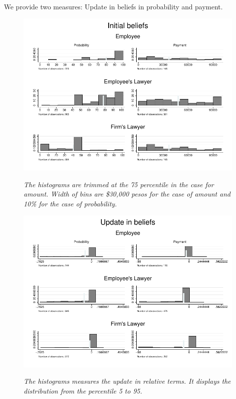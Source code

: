 \documentclass[12pt]{article}
\theoremstyle{named}
\newcommand{\folder}{./Effect}
\begin{document}
We provide two measures: Update in beliefs in probability and payment.\\

\begin{center}
\scriptsize{}
\end{center}

\begin{figure}[H]
\label{diff}
\begin{center}
\includegraphics[width=\textwidth]{./Figures/belief.pdf}
\end{center}
{\footnotesize \textit{The histograms are trimmed at the 75 percentile in the case for amount. Width of bins are \$30,000 pesos for the case of amount and 10\% for the case of probability.}}
\end{figure}


\begin{figure}[H]
\label{update}
\begin{center}
\includegraphics[width=\textwidth]{./Figures/update_belief.pdf}
\end{center}
{\footnotesize \textit{The histograms measures the update in relative terms. It displays the distribution from the percentile 5 to 95.}}
\end{figure}
\end{document}
